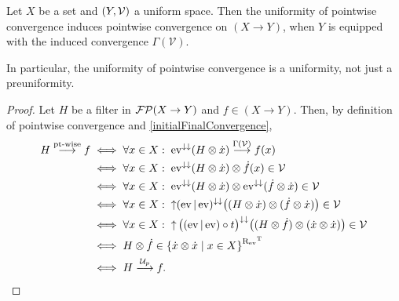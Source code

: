 \begin{proposition}
Let $X$ be a set and $\sSet{Y, \mathcal{V}}$ a uniform space. Then the uniformity of pointwise convergence induces pointwise convergence on $(X\to Y)$, when $Y$ is equipped with the induced convergence $\Gamma(\mathcal{V})$.
\end{proposition}
In particular, the uniformity of pointwise convergence is a uniformity, not just a preuniformity.
\begin{proof}
Let $H$ be a filter in $\operatorname{\mathcal{FP}}(X\to Y)$ and $f\in (X\to Y)$. Then, by definition of pointwise convergence and \ref{initialFinalConvergence},
\begin{align*}
H\overset{\text{pt-wise}}{\longrightarrow} f &\iff \forall x\in X: \; \evalMap^{\imf\imf}(H\otimes\pfilter{x}) \overset{\Gamma(\mathcal{V})}{\longrightarrow} f(x) \\
&\iff \forall x\in X: \; \evalMap^{\imf\imf}(H\otimes\pfilter{x}) \otimes \pfilter{f}(x) \in\mathcal{V} \\
&\iff \forall x\in X: \; \evalMap^{\imf\imf}(H\otimes\pfilter{x}) \otimes \evalMap^{\imf\imf}(\pfilter{f}\otimes \pfilter{x}) \in\mathcal{V} \\
&\iff \forall x\in X: \; \upset(\evalMap|\evalMap)^{\imf\imf}\big((H\otimes \pfilter{x}) \otimes (\pfilter{f}\otimes \pfilter{x})\big) \in\mathcal{V} \\
&\iff \forall x\in X: \; \upset\big((\evalMap|\evalMap)\circ t\big)^{\imf\imf}\big((H\otimes \pfilter{f}) \otimes (\pfilter{x}\otimes \pfilter{x})\big) \in\mathcal{V} \\
&\iff H\otimes \pfilter{f} \in \setbuilder{\pfilter{x}\otimes\pfilter{x}}{x\in X}^{\uRelEv^\transp} \\
&\iff H \overset{\mathcal{U}_p}{\longrightarrow} f.
\end{align*}
\end{proof}

